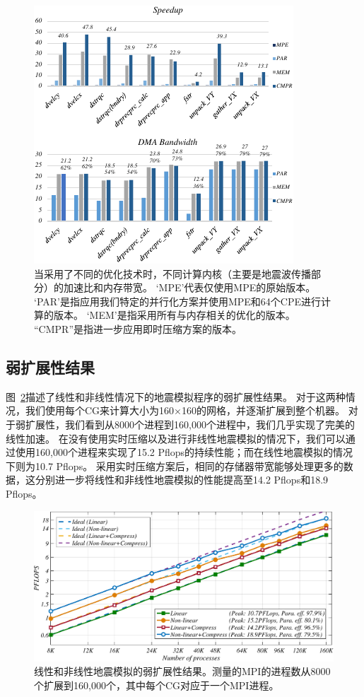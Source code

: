 \documentclass[degree=doctor]{thuthesis}
\begin{document}
\begin{figure}[t]
\centering
\includegraphics[width=0.9\columnwidth]{awp_performance.pdf}
\caption{当采用了不同的优化技术时，不同计算内核（主要是地震波传播部分）的加速比和内存带宽。 `MPE'代表仅使用MPE的原始版本。 `PAR'是指应用我们特定的并行化方案并使用MPE和64个CPE进行计算的版本。 `MEM'是指采用所有与内存相关的优化的版本。 “CMPR”是指进一步应用即时压缩方案的版本。}
\label{fig:kernel-result}
\end{figure}

\subsection{弱扩展性结果}

图~\ref {fig:weak-scaling}描述了线性和非线性情况下的地震模拟程序的弱扩展性结果。 对于这两种情况，我们使用每个CG来计算大小为160×160的网格，并逐渐扩展到整个机器。 对于弱扩展性，我们看到从8000个进程到160,000个进程中，我们几乎实现了完美的线性加速。 在没有使用实时压缩以及进行非线性地震模拟的情况下，我们可以通过使用160,000个进程来实现了15.2 Pflops的持续性能；而在线性地震模拟的情况下则为10.7 Pflops。 采用实时压缩方案后，相同的存储器带宽能够处理更多的数据，这分别进一步将线性和非线性地震模拟的性能提高至14.2 Pflops和18.9 Pflops。

\begin{figure}[ht]
\centering
\includegraphics[width=0.9\columnwidth]{weak_scaling.pdf}
\caption{线性和非线性地震模拟的弱扩展性结果。测量的MPI的进程数从8000个扩展到160,000个，其中每个CG对应于一个MPI进程。}
\label{fig:weak-scaling}
\end{figure}
\end{document}
